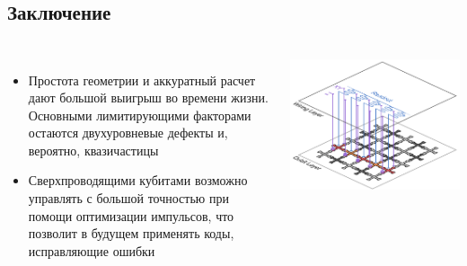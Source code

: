 \documentclass[aspectratio=169, 13pt, t]{beamer}
\begin{document}
\section*{}
\subsection*{Заключение}
\begin{frame}[c]\frametitle{\secname}\framesubtitle{\subsecname}
\begin{columns}[c]
\begin{itemize}
\item Простота геометрии и аккуратный расчет дают большой выигрыш во времени жизни. Основными лимитирующими факторами остаются двухуровневые дефекты и, вероятно, квазичастицы
\item Сверхпроводящими кубитами возможно управлять с большой точностью при помощи оптимизации импульсов, что позволит в будущем применять коды, исправляющие ошибки
\end{itemize}
\centering

\includegraphics[width=\textwidth]{errcorr}
\end{columns}

\end{frame}
\end{document}
